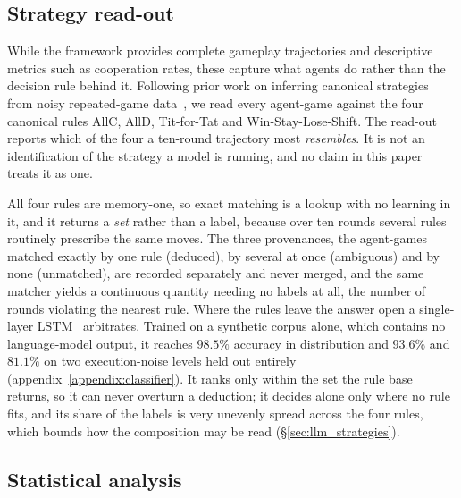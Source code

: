 \documentclass[openacc]{rsproca_new}
\begin{document}
\subsection{Strategy read-out}\label{sec:readout}

While the framework provides complete gameplay trajectories and descriptive
metrics such as cooperation rates, these capture what agents do rather than the
decision rule behind it. Following prior work on inferring canonical strategies
from noisy repeated-game data~\cite{han2011role,Han2012ALIFEjournal,diStefanoIntention2023},
we read every agent-game against the four canonical rules AllC, AllD,
Tit-for-Tat and Win-Stay-Lose-Shift. The read-out reports which of the four a
ten-round trajectory most \emph{resembles}. It is not an identification of the
strategy a model is running, and no claim in this paper treats it as one.

All four rules are memory-one, so exact matching is a lookup with no learning
in it, and it returns a \emph{set} rather than a label, because over ten rounds
several rules routinely prescribe the same moves. The three provenances, the
agent-games matched exactly by one rule (deduced), by several at once
(ambiguous) and by none (unmatched), are recorded separately and never merged,
and the same matcher yields a continuous quantity needing no labels at all, the
number of rounds violating the nearest rule. Where the rules leave the answer
open a single-layer LSTM~\cite{lstm} arbitrates. Trained on a synthetic corpus
alone, which contains no language-model output, it reaches $98.5\%$ accuracy in
distribution and $93.6\%$ and $81.1\%$ on two execution-noise levels held out
entirely (appendix~\ref{appendix:classifier}). It ranks only within the set the
rule base returns, so it can never overturn a deduction; it decides alone only
where no rule fits, and its share of the labels is very unevenly spread across
the four rules, which bounds how the composition may be read
(\S\ref{sec:llm_strategies}).

\subsection{Statistical analysis}\label{sec:stats}
\end{document}
